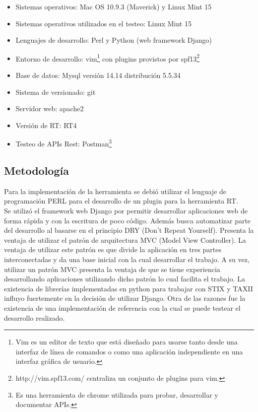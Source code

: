 \documentclass[11pt]{article}
\begin{document}
\begin{itemize}
	\item Sistemas operativos: Mac OS 10.9.3 (Maverick) y Linux Mint 15
	\item Sistemas operativos utilizados en el testeo: Linux Mint 15
	\item Lenguajes de desarrollo: Perl y Python (web framework Django)
	\item Entorno de desarrollo: vim\footnote{Vim es un editor de texto que está diseñado para usarse tanto desde una interfaz de línea de comandos o como una aplicación independiente en una interfaz gráfica de usuario.}  con plugins provistos por spf13\footnote{http://vim.spf13.com/ centraliza un conjunto de plugins para vim.}
	\item Base de datos: Mysql versión 14.14 distribución 5.5.34
	\item Sistema de versionado: git
	\item Servidor web: apache2
	\item Versión de RT: RT4
	\item Testeo de APIs Rest: Postman\footnote{Es una herramienta de chrome utilizada para probar, desarrollar y documentar APIs.}

\end{itemize}

\subsection{Metodología}
Para la implementación de la herramienta se debió utilizar el lenguaje de programación PERL para el desarrollo de un plugin para la herramienta RT.\\

Se utilizó el framework web Django por permitir desarrollar aplicaciones web de forma rápida y con la escritura de poco código. Además busca automatizar parte del desarrollo al basarse en el principio DRY (Don’t Repeat Yourself). Presenta la ventaja de utilizar el patrón de arquitectura MVC (Model View Controller). La ventaja de utilizar este patrón es que divide la aplicación en tres partes interconectadas y da una base inicial con la cual desarrollar el trabajo. A su vez, utilizar un patrón MVC presenta la ventaja de que se tiene experiencia desarrollando aplicaciones utilizando dicho patrón lo cual facilita el trabajo.
La existencia de librerías implementadas en python para trabajar con STIX y TAXII influyo fuertemente en la decisión de utilizar Django. Otra de las razones fue la existencia de una implementación de referencia con la cual se puede testear el desarrollo realizado.\\
\end{document}
